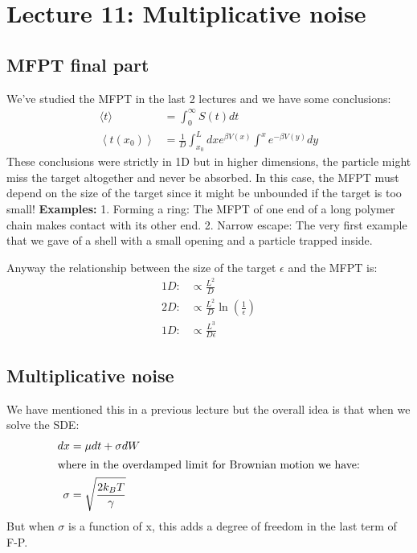 \documentclass{report}
\begin{document}
\chapter{Lecture 11: Multiplicative noise}
\section{MFPT final part}
We've studied the MFPT in the last 2 lectures and we have some conclusions:
\begin{align}
    \langle t\rangle                            & =\int_0^{\infty} S(t) d t                                               \\
    \left\langle t\left(x_0\right)\right\rangle & =\frac{1}{D} \int^L_{x_0} d x e^{\beta V(x)} \int^x e^{-\beta V(y)} d y
\end{align}
These conclusions were strictly in 1D but in higher dimensions, the particle might miss the target altogether and never be absorbed. In this case, the MFPT must depend on the size of the target since it might be unbounded if the target is too small!
\textbf{Examples:} 1. Forming a ring: The MFPT of one end of a long polymer chain makes contact with its other end. 2. Narrow escape: The very first example that we gave of a shell with a small opening and a particle trapped inside.

Anyway the relationship between the size of the target $\epsilon$ and the MFPT is:
\begin{align}
    1D: & \propto \frac{L^2}{D}                         \\
    2D: & \propto \frac{L^2}{D} \ln(\frac{1}{\epsilon}) \\
    1D: & \propto \frac{L^3}{D\epsilon}
\end{align}
\section{Multiplicative noise}
We have mentioned this in a previous lecture but the overall idea is that when we solve the SDE:
\begin{align}
    d x    & =\mu d t+\sigma d W            \\
    \intertext{where in the overdamped limit for Brownian motion we have:}
    \sigma & =\sqrt{\frac{2 k_B T}{\gamma}}
\end{align}
But when $\sigma$ is a function of x, this adds a degree of freedom in the last term of F-P.
\end{document}
